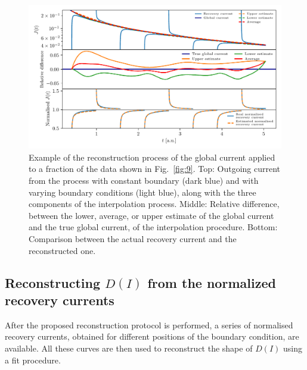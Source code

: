 \begin{figure}[htp]
    \centering    
    \includegraphics[width=\textwidth]{4_probing_the_diffusive_behavior/figs/final/the_interpolation.pdf}
    \caption{Example of the reconstruction process of the global current applied to a fraction of the data shown in Fig.~\ref{fig:9}. Top: Outgoing current from the process with constant boundary (dark blue) and with varying boundary conditions (light blue), along with the three components of the interpolation process. Middle: Relative difference, between the lower, average, or upper estimate of the global current and the true global current, of the interpolation procedure. Bottom: Comparison between the actual recovery current and the reconstructed one.}
    \label{fig:protocol}
\end{figure}


\subsection{Reconstructing $D(I)$ from the normalized recovery currents}


After the proposed reconstruction protocol is performed, a series of normalised recovery currents, obtained for different positions of the boundary condition, are available. All these curves are then used to reconstruct the shape of $D(I)$ using a fit procedure.


